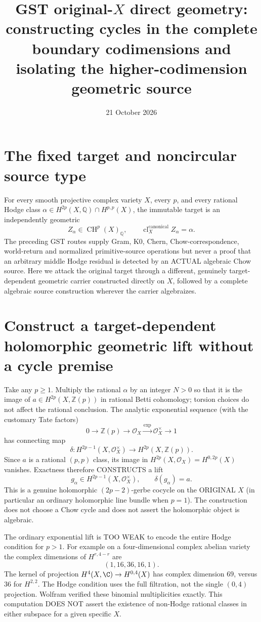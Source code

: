 \documentclass[11pt]{article}
\title{GST original-\(X\) direct geometry: constructing cycles in the complete boundary codimensions and isolating the higher-codimension geometric source}
\date{21 October 2026}
\newcommand{\Q}{\mathbb Q}
\newcommand{\Z}{\mathbb Z}
\newcommand{\CH}{\operatorname{CH}}
\newcommand{\cl}{\operatorname{cl}}
\begin{document}
\maketitle

\section{The fixed target and noncircular source type}
For every smooth projective complex variety \(X\), every
\(p\), and every rational Hodge class
\(\alpha\in H^{2p}(X,\Q)\cap H^{p,p}(X)\),
the immutable target is an independently geometric
\[
 Z_\alpha\in \CH^p(X)_\Q,\qquad
       \cl_X^{\mathrm{canonical}}Z_\alpha=\alpha.
\]
The preceding GST routes supply Gram, K0, Chern, Chow-correspondence,
world-return and normalized primitive-source operations but never
a proof that an arbitrary middle Hodge residual is detected by
an ACTUAL algebraic Chow source. Here we attack the original
target through a different, genuinely target-dependent geometric
carrier constructed directly on \(X\), followed by a complete
algebraic source construction wherever the carrier algebraizes.

\section{Construct a target-dependent holomorphic geometric lift without a cycle premise}
Take any \(p\ge1\). Multiply the rational \(\alpha\) by an integer
\(N>0\) so that it is the image of
\(a\in H^{2p}(X,\Z(p))\) in rational Betti cohomology;
torsion choices do not affect the rational conclusion.
The analytic exponential sequence (with the customary Tate factors)
\[
 0\longrightarrow\Z(p)
 \longrightarrow\mathcal O_X
 \xrightarrow{\exp}\mathcal O_X^\times
 \longrightarrow1
\]
has connecting map
\[
 \delta:H^{2p-1}(X,\mathcal O_X^\times)
                 \longrightarrow H^{2p}(X,\Z(p)).
\]
Since \(a\) is a rational \((p,p)\) class, its image in
\(H^{2p}(X,\mathcal O_X)=H^{0,2p}(X)\) vanishes.
Exactness therefore CONSTRUCTS a lift
\[
 \boxed{g_\alpha\in
 H^{2p-1}(X,\mathcal O_X^\times),\qquad
           \delta(g_\alpha)=a.}                 \tag{1}
\]
This is a genuine holomorphic
\((2p-2)\)-gerbe cocycle on the ORIGINAL \(X\)
(in particular an ordinary holomorphic line bundle when \(p=1\)).
The construction does not choose a Chow cycle and does not assert
the holomorphic object is algebraic.

The ordinary exponential lift is TOO WEAK to encode the
entire Hodge condition for \(p>1\). For example on a
four-dimensional complex abelian variety the complex dimensions
of \(H^{r,4-r}\) are
\[
 (1,16,36,16,1).
\]
The kernel of projection \(H^4(X,\C)\to H^{0,4}(X)\)
has complex dimension \(69\), versus \(36\) for \(H^{2,2}\).
The Hodge condition uses the full filtration, not
the single \((0,4)\) projection.
Wolfram verified these binomial multiplicities exactly.
This computation DOES NOT assert the existence of
non-Hodge rational classes in either subspace for a given
specific \(X\).
\end{document}
